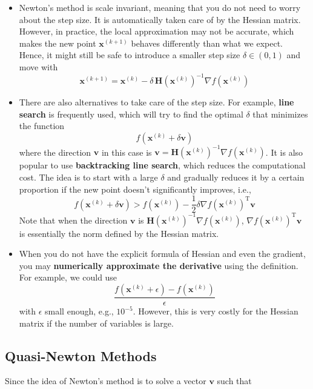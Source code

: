 \documentclass[
]{book}
\providecommand{\tightlist}{%
  \setlength{\itemsep}{0pt}\setlength{\parskip}{0pt}}
\theoremstyle{definition}
\theoremstyle{definition}
\theoremstyle{definition}
\theoremstyle{definition}
\theoremstyle{remark}
\begin{document}
\begin{itemize}
\tightlist
\item
  Newton's method is scale invariant, meaning that you do not need to worry about the step size. It is automatically taken care of by the Hessian matrix. However, in practice, the local approximation may not be accurate, which makes the new point \(\mathbf{x}^{(k+1)}\) behaves differently than what we expect. Hence, it might still be safe to introduce a smaller step size \(\delta \in (0, 1)\) and move with\\
  \[\mathbf{x}^{(k+1)} = \mathbf{x}^{(k)} -  \delta \, \mathbf{H}(\mathbf{x}^{(k)})^{-1} \nabla f(\mathbf{x}^{(k)})\]
\item
  There are also alternatives to take care of the step size. For example, \textbf{line search} is frequently used, which will try to find the optimal \(\delta\) that minimizes the function
  \[f(\mathbf{x}^{(k)} + \delta \mathbf{v})\]
  where the direction \(\mathbf{v}\) in this case is \(\mathbf{v}= \mathbf{H}(\mathbf{x}^{(k)})^{-1} \nabla f(\mathbf{x}^{(k)})\). It is also popular to use \textbf{backtracking line search}, which reduces the computational cost. The idea is to start with a large \(\delta\) and gradually reduces it by a certain proportion if the new point doesn't significantly improves, i.e.,
  \[f(\mathbf{x}^{(k)} + \delta \mathbf{v}) > f(\mathbf{x}^{(k)}) - \frac{1}{2} \delta \nabla f(\mathbf{x}^{(k)})^\text{T}\mathbf{v}\]
  Note that when the direction \(\mathbf{v}\) is \(\mathbf{H}(\mathbf{x}^{(k)})^{-1} \nabla f(\mathbf{x}^{(k)})\), \(\nabla f(\mathbf{x}^{(k)})^\text{T}\mathbf{v}\) is essentially the norm defined by the Hessian matrix.
\item
  When you do not have the explicit formula of Hessian and even the gradient, you may \textbf{numerically approximate the derivative} using the definition. For example, we could use
  \[ \frac{f(\mathbf{x}^{(k)} + \epsilon) - f(\mathbf{x}^{(k)})}{\epsilon} \]
  with \(\epsilon\) small enough, e.g., \(10^{-5}\). However, this is very costly for the Hessian matrix if the number of variables is large.
\end{itemize}

\hypertarget{quasi-newton-methods}{%
\subsection{Quasi-Newton Methods}\label{quasi-newton-methods}}

Since the idea of Newton's method is to solve a vector \(\mathbf{v}\) such that
\end{document}
